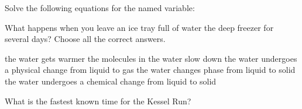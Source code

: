 \documentclass[11pt,addpoints]{exam}   	%
\begin{document}
\begin{questions}
\vspace{.2in}
\pagebreak

\question
Solve the following equations for the named variable:
\vspace{.2in}


\question[5]
What happens when you leave an ice tray full of water the deep freezer for several days?
Choose all the correct answers.

\begin{choices}
\choice the water gets warmer
\choice the molecules in the water slow down
\choice the water undergoes a physical change from liquid to gas
\choice the water changes phase from liquid to solid
\choice the water undergoes a chemical change from liquid to solid
\end{choices}
\vspace{.2in}

\question[1] 
What is the fastest known time for the Kessel Run?


\end{questions}
\end{document}
